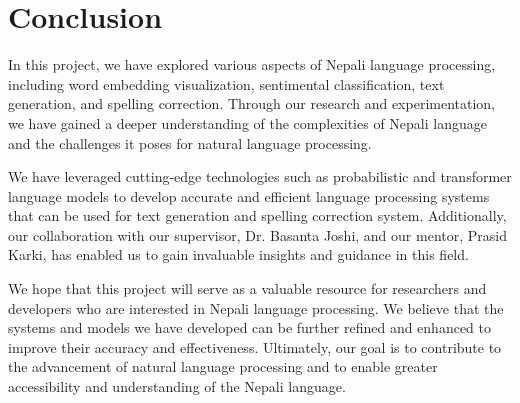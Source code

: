 \chapter{Conclusion}
In this project, we have explored various aspects of Nepali language processing, including word embedding visualization, sentimental classification, text generation, and spelling correction. Through our research and experimentation, we have gained a deeper understanding of the complexities of Nepali language and the challenges it poses for natural language processing.

We have leveraged cutting-edge technologies such as probabilistic and transformer language models to develop accurate and efficient language processing systems that can be used for text generation and spelling correction system. Additionally, our collaboration with our supervisor, Dr. Basanta Joshi, and our mentor, Prasid Karki, has enabled us to gain invaluable insights and guidance in this field.

We hope that this project will serve as a valuable resource for researchers and developers who are interested in Nepali language processing. We believe that the systems and models we have developed can be further refined and enhanced to improve their accuracy and effectiveness. Ultimately, our goal is to contribute to the advancement of natural language processing and to enable greater accessibility and understanding of the Nepali language.